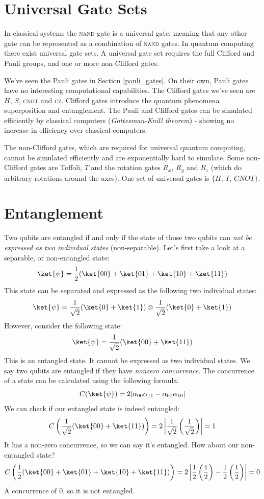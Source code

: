 \documentclass[11pt, notitlepage]{report}
\begin{document}
\section{Universal Gate Sets}
In classical systems the \textsc{nand} gate is a universal gate, meaning that any other gate can be represented as a combination of \textsc{nand} gates. In quantum computing there exist universal gate sets. A universal gate set requires the full Clifford and Pauli groups, and one or more non-Clifford gates.

We've seen the Pauli gates in Section \ref{pauli_gates}. On their own, Pauli gates have no interesting computational capabilities. The Clifford gates we've seen are $H$, $S$, \textsc{cnot} and \textsc{cz}. Clifford gates introduce the quantum phenomena superposition and entanglement. The Pauli and Clifford gates can be simulated efficiently by classical computers (\emph{Gottesman-Knill theorem}) - showing no increase in efficiency over classical computers.

The non-Clifford gates, which are required for universal quantum computing, cannot be simulated efficiently and are exponentially hard to simulate. Some non-Clifford gates are Toffoli, $T$ and the rotation gates $R_x$, $R_y$ and $R_z$ (which do arbitrary rotations around the axes). One set of universal gates is $\{H,\, T,\, CNOT\}$.

\section{Entanglement}
Two qubits are entangled if and only if the state of those two qubits can \emph{not be expressed as two individual states} (non-separable). Let's first take a look at a separable, or non-entangled state:
\[
  \ket{\psi} = \dfrac{1}{2}(\ket{00} + \ket{01} + \ket{10} + \ket{11})
\]
This state can be separated and expressed as the following two individual states:
\[
  \ket{\psi} = \dfrac{1}{\sqrt2}(\ket{0} + \ket{1}) \otimes \dfrac{1}{\sqrt2}(\ket{0} + \ket{1})
\]
However, consider the following state:
\[
  \ket{\psi} = \dfrac{1}{\sqrt2}(\ket{00} + \ket{11})
\]
This is an entangled state. It cannot be expressed as two individual states. We say two qubits are entangled if they have \emph{nonzero concurrence}. The concurrence of a state can be calculated using the following formula:
\[
  C(\ket{\psi}) = 2|\alpha_{00}\alpha_{11} - \alpha_{01}\alpha_{10}|
\]
We can check if our entangled state is indeed entangled:
\[
  C\left(\dfrac{1}{\sqrt2}(\ket{00} + \ket{11})\right) = 2\left|\dfrac{1}{\sqrt2}\left(\dfrac{1}{\sqrt2}\right)\right| = 1
\]
It has a non-zero concurrence, so we can say it's entangled. How about our non-entangled state?
\[
  C\left(\dfrac{1}{2}(\ket{00} + \ket{01} + \ket{10} + \ket{11})\right) = 2\left|\dfrac{1}{2}\left(\dfrac{1}{2}\right) - \dfrac{1}{2}\left(\dfrac{1}{2}\right)\right| = 0
\]
A concurrence of 0, so it is not entangled.
\end{document}
